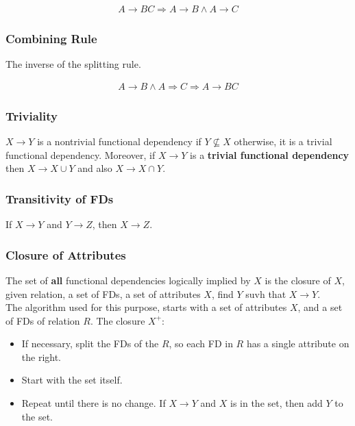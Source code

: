 \documentclass[11pt,a4paper,twocolumn]{book}
\begin{document}
\begin{align}
A \rightarrow BC \Rightarrow A \to B \land A \to C
\end{align}

\subsubsection{Combining Rule}

The inverse of the splitting rule.

\begin{align}
A \rightarrow B \land A \Rightarrow C \Rightarrow A \to BC
\end{align}

\subsubsection{Triviality}

$X \to Y$ is a nontrivial functional dependency if $Y \nsubseteq X$ otherwise, it is a trivial functional dependency. Moreover, if $X \to Y$ is a \textbf{trivial functional dependency} then $X \to X \cup Y$ and also $X \to X \cap Y$.

\subsubsection{Transitivity of FDs}

If $X \to Y$ and $Y \to Z$, then $X \to Z$.

\subsubsection{Closure of Attributes}

The set of \textbf{all} functional dependencies logically implied by $X$ is the closure of $X$, given relation, a set of FDs, a set of attributes $X$, find $Y$ suvh that $X \to Y$.\\

The algorithm used for this purpose, starts with a set of attributes $X$, and a set of FDs of relation $R$. The closure $X^+$:

\begin{itemize}
\item If necessary, split the FDs of the $R$, so each FD in $R$ has a single attribute on the right.
\item Start with the set itself.
\item Repeat until there is no change. If $X \to Y$ and $X$ is in the set, then add $Y$ to the set.
\end{itemize}
\end{document}
